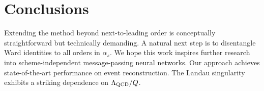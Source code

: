 \section{Conclusions}\label{sec:conclusions}

Extending the method beyond next-to-leading order is conceptually
straightforward but technically demanding. A natural next step is to
disentangle Ward identities to all orders in $\alpha_s$. We hope this
work inspires further research into scheme-independent message-passing
neural networks. Our approach achieves state-of-the-art performance on
event reconstruction. The Landau singularity exhibits a striking
dependence on $\Lambda_{\rm QCD}/Q$.

